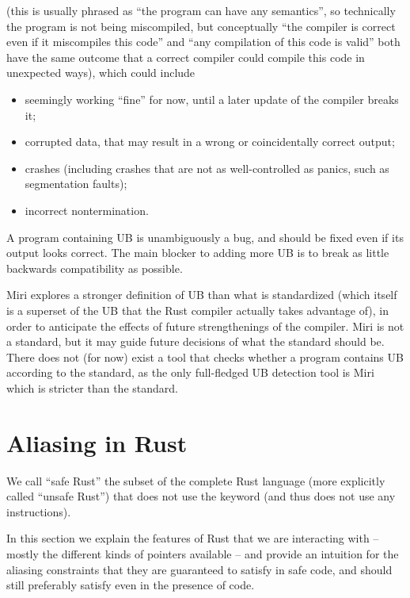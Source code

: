 \documentclass[a4paper,11pt]{article}
\theoremstyle{plain}
\theoremstyle{definition}
\theoremstyle{remark}
\newcommand{\tcode}[1]{\rstinline{#1}}
\begin{document}
\begin{itemize}
        (this is usually phrased as ``the program can have any semantics'', so technically
        the program is not being miscompiled, but conceptually ``the compiler is correct even
        if it miscompiles this code'' and ``any compilation of this code is valid'' both have
        the same outcome that a correct compiler could compile this code in unexpected ways),
        which could include
        \begin{itemize}
            \item seemingly working ``fine'' for now, until a later update of the compiler breaks it;
            \item corrupted data, that may result in a wrong or coincidentally correct output;
            \item crashes (including crashes that are not as well-controlled as
            panics, such as segmentation faults);
            \item incorrect nontermination.
        \end{itemize}
        A program containing UB is unambiguously a bug, and should be fixed even if its output
        looks correct.
        The main blocker to adding more UB is to break as little backwards compatibility as possible.
\end{itemize}

Miri explores a stronger definition of UB than what is standardized (which itself
is a superset of the UB that the Rust compiler actually takes advantage
of), in order to anticipate the effects of future strengthenings of the compiler.
Miri is not a standard, but it may guide future decisions of what the standard should be.
There does not (for now) exist a tool that checks whether a program contains UB
according to the standard, as the only full-fledged UB detection tool is Miri which
is stricter than the standard.

\section{Aliasing in Rust}

We call ``safe Rust'' the subset of the complete Rust language (more explicitly called ``unsafe Rust'')
that does not use the \tcode{unsafe} keyword (and thus does not use any \tcode{unsafe}
instructions).

In this section we explain the features of Rust that we are interacting with --
mostly the different kinds of pointers available -- and provide an intuition
for the aliasing constraints that they are guaranteed to satisfy in safe code,
and should still preferably satisfy even in the presence of \tcode{unsafe} code.
\end{document}

